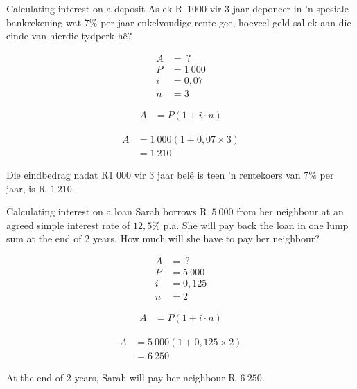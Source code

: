 \begin{wex}{Calculating interest on a deposit}{
    As ek R~$1 000$ vir 3 jaar deponeer
in ’n spesiale bankrekening wat $7\%$ per jaar enkelvoudige rente gee,
hoeveel geld sal ek aan die einde van hierdie tydperk hê?}{

    \begin{align*}
	A &= ~?\\
	P &= 1~000\\
	i &= 0,07\\
	n &= 3
    \end{align*}
    
    \begin{align*}
	A &= P(1 + i \cdot n)
    \end{align*}

    \begin{align*}
	A &= 1~000(1 + 0,07 \times 3)\\
	  &= 1~210
    \end{align*}

    Die eindbedrag nadat R1 000 vir 3 jaar belê is teen ’n rentekoers
van $7\%$ per jaar, is R~$1~210$.
    }
\end{wex}


\begin{wex}{Calculating interest on a loan}{
    Sarah borrows R~$5~000$ from her neighbour at an agreed simple interest rate of $12,5\%$ p.a. She will pay back the loan in one lump sum at the end of 2 years. How much will she have to pay her neighbour?}{

    \begin{align*}
	A &= ~?\\
	P &= 5~000\\
	i &= 0,125\\
	n &= 2
    \end{align*}

    \begin{align*}
	A &= P(1 + i \cdot n)
    \end{align*}

    \begin{align*}
	A &= 5~000(1 + 0,125 \times 2)\\
	  &= 6~250
    \end{align*}

    At the end of 2 years, Sarah will pay her neighbour R~$6~250$.
    }
\end{wex}


